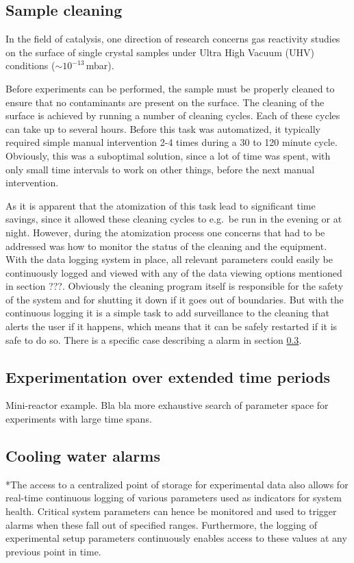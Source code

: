 \subsection{Sample cleaning}
In the field of catalysis, one direction of research concerns gas
reactivity studies on the surface of single crystal samples under
Ultra High Vacuum (UHV)
conditions ($\sim10^{-13}$\,mbar).

Before experiments can be performed, the sample must be properly
cleaned to ensure that no contaminants are present on the surface. The
cleaning of the surface is achieved by running a number of cleaning
cycles. Each of these cycles can take up to several hours.%
Before this task was automatized, it typically required simple manual
intervention 2-4 times during a 30 to 120 minute cycle. Obviously, this
was a suboptimal solution, since a lot of time was spent, with only
small time intervals to work on other things, before the next manual
intervention.

As it is apparent that the atomization of this task lead to
significant time savings, since it allowed these cleaning cycles to
e.g.\ be run in the evening or at night. However, during the
atomization process one concerns that had to be addressed was how to
monitor the status of the cleaning and the equipment. With the data
logging system in place, all relevant parameters could easily be
continuously logged and viewed with any of the data viewing options
mentioned in section ???. Obviously the cleaning
program itself is responsible for the safety of the system and for
shutting it down if it goes out of boundaries. But with the continuous
logging it is a simple task to add surveillance to the cleaning that
alerts the user if it happens, which means that it can be safely
restarted if it is safe to do so. There is a specific case describing
a alarm in section \ref{sec:cooling_water_alarms}.

\subsection{Experimentation over extended time periods}

Mini-reactor example. Bla bla more exhaustive search of parameter
space for experiments with large time spans. 

\subsection{Cooling water alarms}\label{sec:cooling_water_alarms}
*The access to a centralized point of storage for experimental data also allows
for real-time continuous logging of various parameters used as indicators for
system health. Critical system parameters can hence be monitored and used to
trigger alarms when these fall out of specified ranges. Furthermore, the
logging of experimental setup parameters continuously enables access to these
values at any previous point in time.

